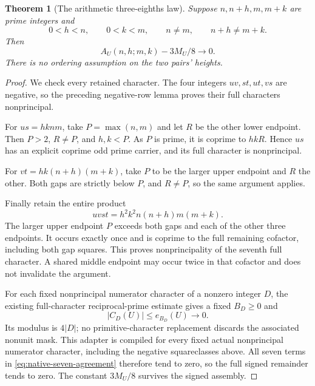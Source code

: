 \documentclass[11pt]{article}
\newtheorem{theorem}{Theorem}[section]
\begin{document}
\begin{theorem}[The arithmetic three-eighths law]
\label{thm:native-short-three-eighths}
Suppose \(n,n+h,m,m+k\) are prime integers and
\[
 0<h<n,\qquad 0<k<m,\qquad n\ne m,\qquad n+h\ne m+k.
\]
Then
\[
                       A_U(n,h;m,k)-3M_U/8\longrightarrow0.
\]
There is no ordering assumption on the two pairs' heights.
\end{theorem}
\begin{proof}
We check every retained character. The four integers
\(uv,st,ut,vs\) are negative, so the preceding negative-row lemma
proves their full characters nonprincipal.

For \(us=hknm\), take \(P=\max(n,m)\) and let \(R\) be the
other lower endpoint. Then \(P>2\), \(R\ne P\), and \(h,k<P\).
As \(P\) is prime, it is coprime to \(hkR\). Hence \(us\) has an
explicit coprime odd prime carrier, and its full character is
nonprincipal.

For \(vt=hk(n+h)(m+k)\), take \(P\) to be the larger upper
endpoint and \(R\) the other. Both gaps are strictly below \(P\),
and \(R\ne P\), so the same argument applies.

Finally retain the entire product
\[
                  uvst=h^2k^2n(n+h)m(m+k).
\]
The larger upper endpoint \(P\) exceeds both gaps and each of the
other three endpoints. It occurs exactly once and is coprime to
the full remaining cofactor, including both gap squares.
This proves nonprincipality of the seventh full character.
A shared middle endpoint may occur twice in that cofactor and
does not invalidate the argument.

For each fixed nonprincipal numerator character of a nonzero
integer \(D\), the existing full-character reciprocal-prime estimate
gives a fixed \(B_D\ge0\) and
\[
                         |C_D(U)|\le e_{B_D}(U)\longrightarrow0.
\]
Its modulus is \(4|D|\); no primitive-character replacement discards
the associated nonunit mask. This adapter is compiled for every
fixed actual nonprincipal numerator character, including the negative
squareclasses above. All seven terms in
\eqref{eq:native-seven-agreement} therefore tend to zero, so the full
signed remainder tends to zero.
The constant \(3M_U/8\) survives the signed assembly.
\end{proof}
\end{document}
